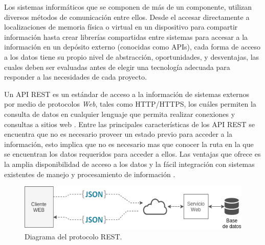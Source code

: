 


Los sistemas informáticos que se componen de más de un componente, utilizan diversos métodos de comunicación entre ellos. Desde el accesar directamente a localizaciones de memoria física o virtual en un dispositivo para compartir información hasta crear librerías compartidas entre sistemas para accesar a la información en un depósito externo (conocidas como APIs), cada forma de acceso a los datos tiene su propio nivel de abstracción, oportunidades, y desventajas, las cuales deben ser evaluadas antes de elegir una tecnología adecuada para responder a las necesidades de cada proyecto.

Un API REST es un estándar de acceso a la información de sistemas externos por medio de protocolos \textit{Web}, tales como HTTP/HTTPS, los cuáles permiten la consulta de datos en cualquier lenguaje que permita realizar conexiones y consultas a sitios web \cite{REST_API_design}. Entre las principales características de los API REST se encuentra que no es necesario proveer un estado previo para acceder a la información, esto implica que no es necesario mas que conocer la ruta en la que se encuentran los datos requeridos para acceder a ellos. Las ventajas que ofrece es la amplia disponibilidad de acceso a los datos y la fácil integración con sistemas existentes de manejo y procesamiento de información \cite{OpenAPI_example}.


\begin{figure}[!ht]
	\centering
	\includegraphics[width=.70\linewidth]{images/diagrams/rest.drawio.png}
	\caption{Diagrama del protocolo REST.}
	\label{fig:rest_protocolo_imagen}
\end{figure}


